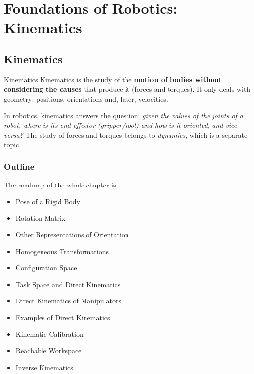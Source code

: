 \pagebreak

\section{Foundations of Robotics: Kinematics}

\subsection{Kinematics}



\begin{defbox}{Kinematics}
Kinematics is the study of the \textbf{motion of bodies without considering the causes} that produce it (forces and torques). It only deals with geometry: positions, orientations and, later, velocities.
\end{defbox}

In robotics, kinematics answers the question: \emph{given the values of the joints of a robot, where is its end-effector (gripper/tool) and how is it oriented, and vice versa?} The study of forces and torques belongs to \emph{dynamics}, which is a separate topic.



\subsubsection{Outline}

 The roadmap of the whole chapter is:

\begin{itemize}
    \item Pose of a Rigid Body
    \item Rotation Matrix
    \item Other Representations of Orientation
    \item Homogeneous Transformations
    \item Configuration Space
    \item Task Space and Direct Kinematics
    \item Direct Kinematics of Manipulators
    \item Examples of Direct Kinematics
    \item Kinematic Calibration
    \item Reachable Workspace
    \item Inverse Kinematics
\end{itemize}

